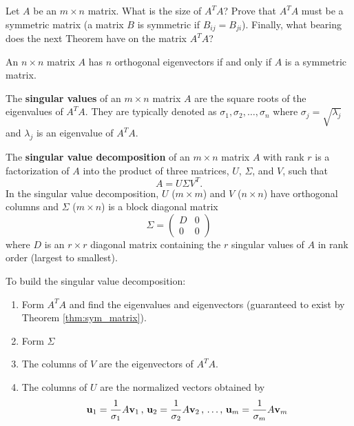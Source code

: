 \begin{problem}
    Let $A$ be an $m \times n$ matrix.  What is the size of $A^T A$?  Prove that $A^T A$
    must be a symmetric matrix (a matrix $B$ is symmetric if $B_{ij} = B_{ji}$).  Finally, what bearing
    does the next Theorem have on the matrix $A^T A$?
\end{problem}




\begin{thm}\label{thm:sym_matrix}
    An $n \times n$ matrix $A$ has $n$ orthogonal eigenvectors if and only if $A$ is a
    symmetric matrix.
\end{thm}


\begin{definition}
The {\bf singular values} of an $m \times n$ matrix $A$ are the square roots of the
eigenvalues of $A^T A$.
They are typically denoted as $\sigma_1, \sigma_2, \dots, \sigma_n$ where $\sigma_j =
\sqrt{\lambda_j}$ and $\lambda_j$ is an eigenvalue of $A^T A$.  
\end{definition}

\begin{definition}
    The {\bf singular value decomposition} of an $m \times n$ matrix $A$ with rank $r$ is
    a factorization of $A$ into the product of three matrices, $U$, $\Sigma$, and $V$,
    such that
    \[ A = U \Sigma V^T. \]
    In the singular value decomposition, $U$ ($m \times m$) and $V$ ($n \times n$) have
    orthogonal columns and $\Sigma$ ($m \times n$)
    is a block diagonal matrix 
    \[ \Sigma = \begin{pmatrix} D & 0 \\ 0 & 0 \end{pmatrix} \]
    where $D$ is an $r \times r$ diagonal matrix containing the $r$ singular values of
    $A$ in rank order (largest to smallest).

    To build the singular value decomposition:
    \begin{enumerate}
        \item Form $A^TA$ and find the eigenvalues and eigenvectors (guaranteed to exist
            by Theorem \ref{thm:sym_matrix}).
        \item Form $\Sigma$
        \item The columns of $V$ are the eigenvectors of $A^T A$.
        \item The columns of $U$ are the normalized vectors obtained by 
            \[ {\bf u}_1 = \frac{1}{\sigma_1} A {\bf v}_1\, , \, {\bf u}_2 = \frac{1}{\sigma_2} A
            {\bf v}_2 \, , \, \dots, \, {\bf u}_m = \frac{1}{\sigma_m} A {\bf v}_m \]
    \end{enumerate}
\end{definition}

